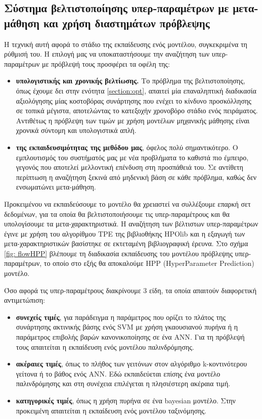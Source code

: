 \subsection{Σύστημα βελτιστοποίησης υπερ-παραμέτρων με μετα-μάθηση και χρήση διαστημάτων πρόβλεψης} \label{sec:HPP}
Η τεχνική αυτή αφορά το στάδιο της εκπαίδευσης ενός μοντέλου, συγκεκριμένα τη ρύθμισή του. Η επιλογή μας να υποκαταστήσουμε την αναζήτηση των υπερ-παραμέτρων με πρόβλεψή τους προσφέρει τα οφέλη της:
\begin{itemize}
	\item \textbf{υπολογιστικής και χρονικής βελτίωσης.} Το πρόβλημα της βελτιστοποίησης, όπως έχουμε δει στην ενότητα \ref{section:opt}, απαιτεί μία επαναληπτική διαδικασία αξιολόγησης μίας κοστοβόρας συνάρτησης που ενέχει το κίνδυνο προσκόλλησης σε τοπικά μέγιστα, αποτελώντας το κατεξοχήν χρονοβόρο στάδιο ενός πειράματος. Αντιθέτως η πρόβλεψη των τιμών με χρήση μοντέλων μηχανικής μάθησης είναι χρονικά σύντομη και υπολογιστικά απλή.
	\item \textbf{της εκπαιδευσιμότητας της μεθόδου μας}, όφελος πολύ σημαντικότερο. Ο εμπλουτισμός του συστήματός μας με νέα προβλήματα το καθιστά πιο έμπειρο, γεγονός που αποτελεί μελλοντική επένδυση στη προσπάθειά του. Σε αντίθετη περίπτωση η αναζήτηση ξεκινά από μηδενική βάση σε κάθε πρόβλημα, καθώς δεν ενσωματώνει μετα-μάθηση. 
\end{itemize}

Προκειμένου να εκπαιδεύσουμε το μοντέλο θα χρειαστεί να συλλέξουμε επαρκή σετ δεδομένων, για τα οποία θα βελτιστοποιήσουμε τις υπερ-παραμέτρους και θα υπολογίσουμε τα μετα-χαρακτηριστικά. Η αναζήτηση των βέλτιστων υπερ-παραμέτρων έγινε με χρήση του αλγορίθμου TPE της βιβλιοθήκης HPOlib και η εξαγωγή των μετα-χαρακτηριστικών βασίστηκε σε εκτεταμένη βιβλιογραφική έρευνα. Στο σχήμα \ref{fig: flowHPP} βλέπουμε τη διαδικασία εκπαίδευσης του μοντέλου πρόβλεψης υπερ-παραμέτρων, το οποίο στο εξής θα αποκαλούμε HPP (HyperParameter Prediction) μοντέλο.

Όσο αφορά τις υπερ-παραμέτρους διακρίνουμε 3 είδη, τα οποία απαιτούν διαφορετική αντιμετώπιση:
\begin{itemize}
	\item \textbf{συνεχείς τιμές}, για παράδειγμα η παράμετρος που ορίζει το πλάτος της συνάρτησης ακτινικής βάσης ενός SVM με χρήση γκαουσιανού πυρήνα ή η παράμετρος επιβολής βαρών κανονικοποίησης σε ένα \gls{ANN}. Για τη πρόβλεψή τους απαιτείται η εκπαίδευση ενός μοντέλου παλινδρόμησης.
	\item \textbf{ακέραιες τιμές}, όπως το πλήθος των γειτόνων στον αλγόριθμο k-κοντινότερου γείτονα ή το βάθος ενός \gls{ANN}. Εδώ εκπαιδεύεται επίσης ένα μοντέλο παλινδρόμησης και στη συνέχεια επιλέγεται η πλησιέστερη ακέραια τιμή.
	\item \textbf{κατηγορικές τιμές}, όπως η χρήση πυρήνα σε ένα bayesian μοντέλο. Στην προκειμένη απαιτείται η εκπαίδευση ενός μοντέλου ταξινόμησης.
\end{itemize}


